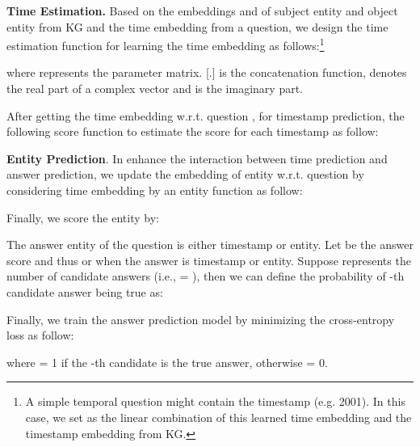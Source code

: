 \documentclass[11pt]{article}
\newcommand{\xhdr}[1]{{\noindent\bfseries #1}.}
\begin{document}
\noindent \textbf{Time Estimation.}
Based on the embeddings  and  of subject entity  and object entity  from KG and the time embedding  from a question, we design the time estimation function  for learning the time embedding  as follows:\footnote{A simple temporal question might contain the timestamp (e.g. 2001). In this case, we set  as the linear combination of this learned time embedding and the timestamp embedding from KG.} 

where  represents the parameter matrix. [.] is the concatenation function,  denotes the real part of a complex vector and  is the imaginary part.

After getting the time embedding w.r.t. question , for timestamp prediction, the following score function to estimate the score for each timestamp  as follow:




\xhdr{Entity Prediction} In enhance the interaction between time prediction and answer prediction, we update the embedding of entity w.r.t. question by considering time embedding  by an entity function  as follow:

Finally, we score the entity  by:




The answer entity of the question is either timestamp or entity. Let  be the answer score and thus  or  when the answer is timestamp or entity. Suppose  represents the number of candidate answers (i.e.,  = ), then we can define the probability of -th candidate answer being true as:

Finally, we train the answer prediction model by minimizing the cross-entropy loss as follow:

where  = 1 if the -th candidate is the true answer, otherwise  = 0.
\end{document}
